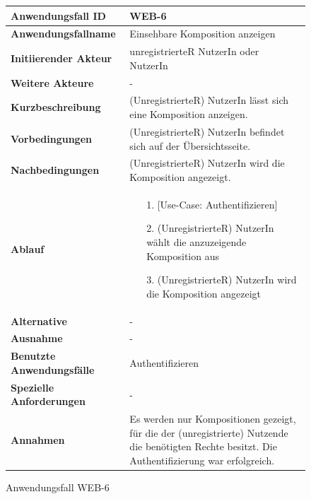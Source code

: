 \begin{figure}[h]
	\centering
	\begin{tabularx}{\textwidth}{ X | X }
		\textbf{Anwendungsfall ID} & WEB-6 \\ \hline
		\textbf{Anwendungsfallname} & Einsehbare Komposition anzeigen \\ \hline
		\textbf{Initiierender Akteur} & unregistrierteR NutzerIn oder NutzerIn\\ \hline
		\textbf{Weitere Akteure} & - \\ \hline
		\textbf{Kurzbeschreibung} & (UnregistrierteR) NutzerIn  lässt sich eine Komposition anzeigen. \\ \hline
		\textbf{Vorbedingungen} & (UnregistrierteR) NutzerIn befindet sich auf der Übersichtsseite. \\ \hline
		\textbf{Nachbedingungen} & (UnregistrierteR) NutzerIn wird die Komposition angezeigt. \\ \hline
		\textbf{Ablauf} &
		\begin{enumerate}
			\item[1.] [Use-Case: Authentifizieren]
			\item[2.] (UnregistrierteR) NutzerIn wählt die anzuzeigende Komposition aus
			\item[3.] (UnregistrierteR) NutzerIn wird die Komposition angezeigt
		\end{enumerate} \\ \hline
		\textbf{Alternative} & - \\ \hline
		\textbf{Ausnahme} & - \\ \hline
		\textbf{Benutzte Anwendungsfälle} & Authentifizieren \\ \hline
		\textbf{Spezielle Anforderungen} & - \\ \hline
		\textbf{Annahmen} & Es werden nur Kompositionen gezeigt, für die der (unregistrierte) Nutzende die benötigten Rechte besitzt. Die Authentifizierung war erfolgreich.
	\end{tabularx}
	\caption{Anwendungsfall WEB-6}
	\label{fig:anwendungsfall-server-tabelle-web-6}
\end{figure}